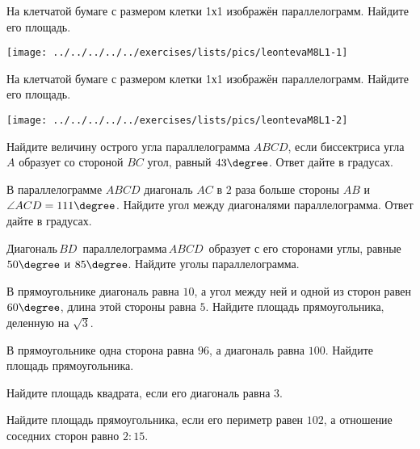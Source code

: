 %
%

\begin{class}[number=1]
	\begin{listofex}
		\item 
		\begin{minipage}[t]{\bodywidth}
			На клетчатой бумаге с размером клетки 1х1 изображён параллелограмм. Найдите его площадь.
		\end{minipage}
		\hspace{0.02\linewidth}
		\begin{minipage}[t]{\picwidth}
			\texttt{[image: ../../../../../exercises/lists/pics/leontevaM8L1-1]}
		\end{minipage}
		\item 
		\begin{minipage}[t]{\bodywidth}
			На клетчатой бумаге с размером клетки 1х1 изображён параллелограмм. Найдите его площадь.
		\end{minipage}
		\hspace{0.02\linewidth}
		\begin{minipage}[t]{\picwidth}
			\texttt{[image: ../../../../../exercises/lists/pics/leontevaM8L1-2]}
		\end{minipage}
		\item Найдите величину острого угла параллелограмма \( ABCD \), если биссектриса угла \( A \) образует со стороной \( BC \) угол, равный \( 43\degree \). Ответ дайте в градусах.
		\item В параллелограмме \( ABCD \) диагональ \( AC \) в \( 2 \) раза больше стороны \( AB \) и \( \angle ACD=111\degree \). Найдите угол между диагоналями параллелограмма. Ответ дайте в градусах.
		\item Диагональ \( BD \)  параллелограмма \( ABCD \)  образует с его сторонами углы, равные \( 50\degree \) и \( 85\degree \). Найдите уголы параллелограмма.
		\item В прямоугольнике диагональ равна \( 10 \), а угол между ней и одной из сторон равен \( 60\degree \), длина этой стороны равна \( 5 \). Найдите площадь прямоугольника, деленную на \( \sqrt{3} \).
		\item В прямоугольнике одна сторона равна \( 96 \), а диагональ равна \( 100 \). Найдите площадь прямоугольника.
		\item Найдите площадь квадрата, если его диагональ равна \( 3 \).
		\item Найдите площадь прямоугольника, если его периметр равен \( 102 \), а отношение соседних сторон равно \(  2:15 \).

\end{listofex}
\end{class}
